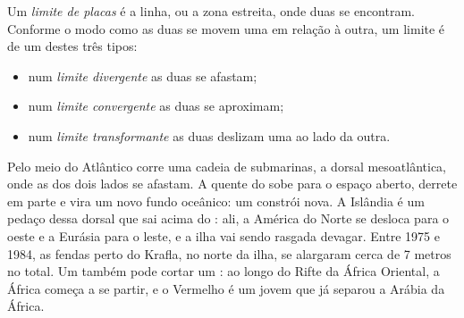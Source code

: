 \begin{definition}\label{def:g7:plate-tectonics:plate-boundary}
Um \emph{limite de placas} é a linha, ou a zona
estreita, onde duas  se encontram. Conforme o modo como as duas
 se movem uma em relação à outra, um limite é de um destes três
tipos:
\begin{itemize}
  \item num \emph{limite divergente} as duas
         se afastam;
  \item num \emph{limite convergente} as duas
         se aproximam;
  \item num \emph{limite transformante} as duas
         deslizam uma ao lado da outra.
\end{itemize}
\end{definition}

\begin{example}\label{ex:g7:plate-tectonics:divergent}
Pelo meio do  Atlântico corre uma cadeia de  submarinas, a
dorsal mesoatlântica, onde as  dos dois lados se afastam. A 
quente do  sobe para o espaço aberto, derrete em parte e vira um novo
fundo oceânico: um  constrói  nova. A Islândia é um
pedaço dessa dorsal que sai acima do : ali, a América do Norte se
desloca para o oeste e a Eurásia para o leste, e a ilha vai sendo rasgada
devagar. Entre 1975 e 1984, as fendas perto do  Krafla, no norte da
ilha, se alargaram cerca de 7 metros no total. Um  também
pode cortar um : ao longo do Rifte da África Oriental, a África
começa a se partir, e o  Vermelho é um  jovem que já separou a
Arábia da África.
\end{example}

